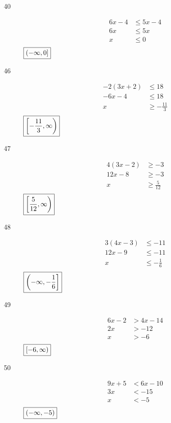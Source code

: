\documentclass[letterpaper, landscape]{exam}
\begin{document}
\begin{description}
      \item[40]
        \begin{align*}
          6x - 4 & \leq 5x - 4 \\
          6x & \leq 5x \\
          x      & \leq 0 \\
        \end{align*}
        $\boxed{ \intoc{ -\infty, 0 } }$

      \item[46]
        \begin{align*}
          -2(3x + 2) & \leq 18 \\
          -6x - 4    & \leq 18 \\
          x          & \geq - \frac{11}{3} \\
        \end{align*}
        $\boxed{ \intco{ -\frac{11}{3}, \infty } }$

      \item[47]
        \begin{align*}
          4 (3x - 2) & \geq -3 \\
          12x - 8    & \geq -3 \\
          x          & \geq \frac{5}{12} \\
        \end{align*}
        $\boxed{ \intco{ \frac{5}{12}, \infty } }$

      \item[48]
        \begin{align*}
          3 (4x - 3) & \leq -11 \\
          12x - 9    & \leq -11 \\
          x          & \leq - \frac{1}{6} \\
        \end{align*}
        $\boxed{ \intoc{ -\infty, - \frac{1}{6} } }$

      \item[49]
        \begin{align*}
          6x - 2 & > 4x - 14 \\
          2x     & > -12 \\
          x      & > -6 \\
        \end{align*}
        $\boxed{ \intco{ -6, \infty } }$

      \item[50]
        \begin{align*}
          9x + 5 & < 6x - 10 \\
          3x     & < -15 \\
          x      & < -5 \\
        \end{align*}
        $\boxed{ \intoo{ -\infty, -5 } }$


\end{description}
\end{document}
